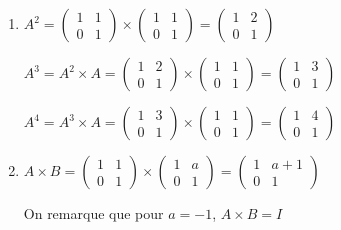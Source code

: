 \begin{corrige}
     \begin{enumerate}
          \item
          $A^{2}=\begin{pmatrix} 1 & 1 \\ 0 & 1\end{pmatrix}\times \begin{pmatrix} 1 & 1 \\ 0  & 1\end{pmatrix}=\begin{pmatrix}1 & 2 \\ 0 & 1 \end{pmatrix}$
          \par
          $A^{3}=A^{2}\times A=\begin{pmatrix} 1 & 2 \\ 0 & 1\end{pmatrix}\times\begin{pmatrix}1 & 1 \\ 0 & 1\end{pmatrix}=\begin{pmatrix}1 & 3 \\ 0 & 1 \end{pmatrix}$
          \par
          $A^{4}=A^{3}\times A=\begin{pmatrix} 1 & 3 \\ 0 & 1\end{pmatrix}\times \begin{pmatrix}1 & 1 \\ 0  & 1\end{pmatrix}=\begin{pmatrix}1 & 4 \\ 0 & 1 \end{pmatrix}$
          \item
          $A\times B=\begin{pmatrix} 1 & 1 \\ 0 & 1\end{pmatrix} \times \begin{pmatrix}1 & a \\ 0 & 1\end{pmatrix}=\begin{pmatrix}1 &  a+1 \\ 0  &  1   \end{pmatrix}$
          \par
          On remarque que pour $a=-1$, $A\times B=I$
          \par

\end{enumerate}
\end{corrige}
